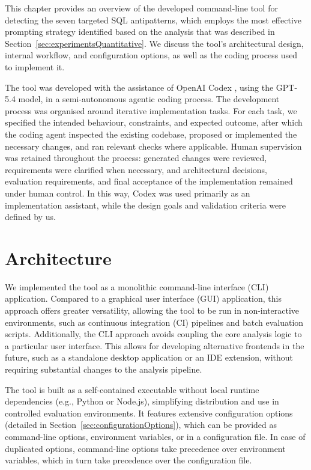 This chapter provides an overview of the developed command-line tool for detecting the seven targeted SQL antipatterns, which employs the most effective prompting strategy identified based on the analysis that was described in Section~\ref{sec:experimentsQuantitative}. We discuss the tool's architectural design, internal workflow, and configuration options, as well as the coding process used to implement it.

The tool was developed with the assistance of OpenAI Codex , using the GPT-5.4  model, in a semi-autonomous agentic coding process. The development process was organised around iterative implementation tasks. For each task, we specified the intended behaviour, constraints, and expected outcome, after which the coding agent inspected the existing codebase, proposed or implemented the necessary changes, and ran relevant checks where applicable. Human supervision was retained throughout the process: generated changes were reviewed, requirements were clarified when necessary, and architectural decisions, evaluation requirements, and final acceptance of the implementation remained under human control. In this way, Codex was used primarily as an implementation assistant, while the design goals and validation criteria were defined by us.

\section{Architecture}

We implemented the tool as a monolithic command-line interface (CLI) application. Compared to a graphical user interface (GUI) application, this approach offers greater versatility, allowing the tool to be run in non-interactive environments, such as continuous integration (CI) pipelines and batch evaluation scripts. Additionally, the CLI approach avoids coupling the core analysis logic to a particular user interface. This allows for developing alternative frontends in the future, such as a standalone desktop application or an IDE extension, without requiring substantial changes to the analysis pipeline.

The tool is built as a self-contained executable without local runtime dependencies (e.g., Python or Node.js), simplifying distribution and use in controlled evaluation environments. It features extensive configuration options (detailed in Section~\ref{sec:configurationOptions}), which can be provided as command-line options, environment variables, or in a configuration file. In case of duplicated options, command-line options take precedence over environment variables, which in turn take precedence over the configuration file.

